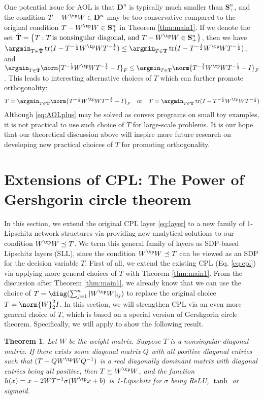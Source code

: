 \documentclass{article} \usepackage{iclr2023_conference,times}
\newcommand{\SC}{\mathbf{S}}
\newcommand{\D}{\mathbf{D}}
\newtheorem{theorem}{Theorem}
\DeclareMathOperator*{\tr}{tr}
\newcommand{\0}{\mathbf{0} }
\begin{document}
One potential issue for AOL is that $\D^n$ is typically much smaller than $\SC_+^n$, and the condition $T-W^\tp W\in \D^n$ may be too conservative compared to the original condition $T-W^\tp W\in \SC_+^n$ in Theorem \ref{thm:main1}. 
If we denote the set $\hat{\mathbf{T}}=\left\{T: T\,\mbox{is nonsingular diagonal, and}\,\, T-W^\tp W\in \SC_+^n\right\}$, then we  have 
 $\argmin_{T\in \hat{\mathbf{T}}} \tr(I-T^{-\frac{1}{2}}W^\tp W T^{-\frac{1}{2}})\le   \argmin_{T\in \mathbf{T}} \tr(I-T^{-\frac{1}{2}}W^\tp W T^{-\frac{1}{2}})$,
 and 
 $\argmin_{T\in \hat{\mathbf{T}}} \norm{T^{-\frac{1}{2}}W^\tp W T^{-\frac{1}{2}}-I}_F\le  \argmin_{T\in \mathbf{T}} \norm{T^{-\frac{1}{2}}W^\tp W T^{-\frac{1}{2}}-I}_F$.
This leads to interesting alternative choices of $T$ which can further promote orthogonality:
\begin{align}\label{eq:AOLplus}
T=\argmin_{T\in \hat{\mathbf{T}}} \norm{T^{-\frac{1}{2}}W^\tp W T^{-\frac{1}{2}}-I}_F\quad \mbox{or}\quad T=\argmin_{T\in \hat{\mathbf{T}}} \tr(I-T^{-\frac{1}{2}}W^\tp W T^{-\frac{1}{2}})
\end{align}
Although \eqref{eq:AOLplus} may be solved as convex programs on small toy examples, it is not practical to use such choice of $T$ for large-scale problems. It is our hope that our theoretical discussion above will inspire
more future research on developing new practical choices of $T$ for promoting orthogonality.


\section{Extensions of CPL: The Power of Gershgorin circle theorem}
\label{sec:ECPL}

In this section, we extend the original CPL layer \eqref{eq:layer} to a new family of 1-Lipschitz network structures via providing new analytical solutions to our condition $W^\tp W\preceq T$. We term this general family of layers as SDP-based Lipschitz layers (SLL), since the condition $W^\tp W\preceq T$ can be viewed as an SDP for the decision variable $T$.
First of all, we extend the existing CPL (Eq. \eqref{eq:cpl}) via applying more general choices of $T$ with Theorem \ref{thm:main1}. From the discussion after Theorem \ref{thm:main1}, we already know that we can use the choice of $T=\diag(\sum_{j=1}^n |W^\tp W|_{ij})$ to replace the original choice $T=\norm{W}_2^2 I$. In this section, we will strengthen CPL via an even more general choice of $T$, which is based on a special version of Gershgorin circle theorem. Specifically, we will apply \cite[Corollary 6.1.6]{horn2012matrix} to show the following result. 
\begin{theorem}\label{thm:main3}
Let $W$ be the weight matrix. 
Suppose $T$ is a nonsingular diagonal matrix. 
If there exists some  diagonal matrix $Q$ with all positive diagonal entries such that $(T-QW^\tp W Q^{-1})$ is a real diagonally dominant matrix with diagonal entries being all positive, then $T\succeq W^\tp W$, and the function $h(x)=x-2WT^{-1}\sigma(W^\tp x+b)$ is 1-Lipschitz for $\sigma$ being ReLU, $\tanh$ or sigmoid. 
\end{theorem}
\end{document}
